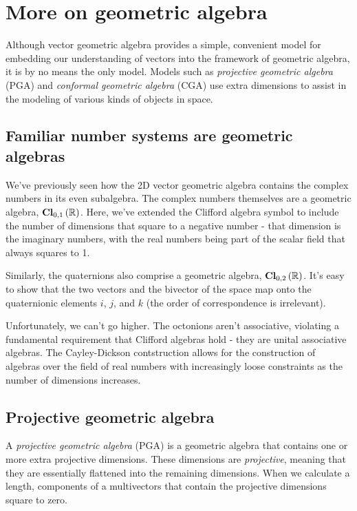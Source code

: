 \chapter{More on geometric algebra}

Although vector geometric algebra provides a simple, convenient model for embedding our
understanding of vectors into the framework of geometric algebra, it is by no means the only model.
Models such as \textit{projective geometric algebra} (PGA) and \textit{conformal geometric algebra}
(CGA) use extra dimensions to assist in the modeling of various kinds of objects in space.

\section{Familiar number systems are geometric algebras}

We've previously seen how the 2D vector geometric algebra contains the complex numbers in its even
subalgebra. The complex numbers themselves are a geometric algebra, $\operatorname{\mathbf{Cl}}_{0,1}\left(\mathbb{R}\right)$. Here,
we've extended the Clifford algebra symbol to include the number of dimensions that square to a
negative number - that dimension is the imaginary numbers, with the real numbers being part of the
scalar field that always squares to 1.

Similarly, the quaternions also comprise a geometric algebra, $\operatorname{\mathbf{Cl}}_{0,2}\left(\mathbb{R}\right)$. It's easy to show that
the two vectors and the bivector of the space map onto the quaternionic elements $i$, $j$, and $k$
(the order of correspondence is irrelevant).

Unfortunately, we can't go higher. The octonions aren't associative, violating a fundamental
requirement that Clifford algebras hold - they are unital associative algebras. The Cayley-Dickson
contstruction allows for the construction of algebras over the field of real numbers with
increasingly loose constraints as the number of dimensions increases.

\section{Projective geometric algebra}

A \textit{projective geometric algebra} (PGA) is a geometric algebra that contains one or more extra
projective dimensions. These dimensions are \textit{projective}, meaning that they are essentially
flattened into the remaining dimensions. When we calculate a length, components of a multivectors
that contain the projective dimensions square to zero.

